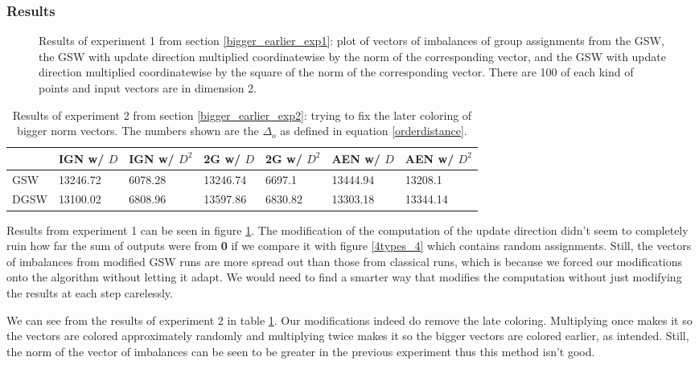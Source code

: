 \documentclass[12pt]{article}
\begin{document}
\subsubsection{Results}
\begin{figure}[h!]

\caption{Results of experiment 1 from section \ref{bigger_earlier_exp1}: plot of vectors of imbalances of group assignments from the GSW, the GSW with update direction multiplied coordinatewise by the norm of the corresponding vector, and the GSW with update direction multiplied coordinatewise by the square of the norm of the corresponding vector. There are 100 of each kind of points and input vectors are in dimension 2.}\label{3_types_d_and_i}
\end{figure}
\begin{table}[h!]
\centering
\caption{Results of experiment 2 from section \ref{bigger_earlier_exp2}: trying to fix the later coloring of bigger norm vectors. The numbers shown are the $\Delta_o$ as defined in equation \ref{orderdistance}.}
\begin{tabular}{l|llllll}
 &IGN w/ $D$&IGN w/ $D^2$& 2G w/ $D$&2G w/ $D^2$& AEN w/ $D$&AEN w/ $D^2$   \\
\hline
GSW&13246.72&6078.28&13246.74&6697.1&13444.94&13208.1\\
DGSW&13100.02&6808.96&13597.86&6830.82&13303.18&13344.14
\end{tabular}
\label{norm_earlier}
\end{table}

Results from experiment 1 can be seen in figure \ref{3_types_d_and_i}. The modification of the computation of the update direction didn't seem to completely ruin how far the sum of outputs were from \textbf{0} if we compare it with figure \ref{4types_4} which contains random assignments. Still, the vectors of imbalances  from modified GSW runs are more spread out than those from classical runs, which is because we forced our modifications onto the algorithm without letting it adapt. We would need to find a smarter way that modifies the computation without just modifying the results at each step carelessly.

We can see from the results of experiment 2 in table \ref{norm_earlier}. Our modifications indeed do remove the late coloring. Multiplying once makes it so the vectors are colored approximately randomly and multiplying twice makes it so the bigger vectors are colored earlier, as intended. Still, the norm of the vector of imbalances can be seen to be greater in the previous experiment thus this method isn't good.
\end{document}
